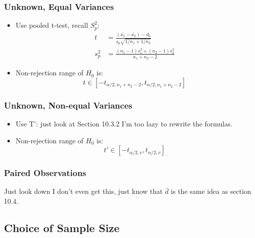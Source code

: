 \documentclass[10pt, letterpaper, twoside]{article}
\begin{document}
\begin{multicols}{2}
\subsubsection{Unknown, Equal Variances}

\begin{itemize}
    \item Use pooled t-test, recall $S_p^2$:
    \begin{align*}
        t &= \frac{(\bar{x_1} - \bar{x_2}) - d_0}{s_p\sqrt{1/n_1 + 1/n_2}}\\
        s_p^2 &= \frac{(n_1 - 1)s_1^2 + (n_2 - 1)s_2^2}{n_1 + n_2 - 2}
    \end{align*}
    \item Non-rejection range of $H_0$ is:
    \begin{equation*}
        t \in [-t_{\alpha/2, n_1+n_2-2}, t_{\alpha/2, n_1+n_2-2}]
    \end{equation*}
\end{itemize}
\subsubsection{Unknown, Non-equal Variances}

\begin{itemize}
    \item Use T': just look at Section 10.3.2 I'm too lazy to rewrite the formulas.
    \item Non-rejection range of $H_0$ is:
    \begin{equation*}
        t' \in [-t_{\alpha/2, v}, t_{\alpha/2, v}]
    \end{equation*}
\end{itemize}

\subsubsection{Paired Observations}

Just look down I don't even get this, just know that $\bar{d}$ is the same idea as section 10.4.

\end{multicols}
\subsection{Choice of Sample Size}
\end{document}
